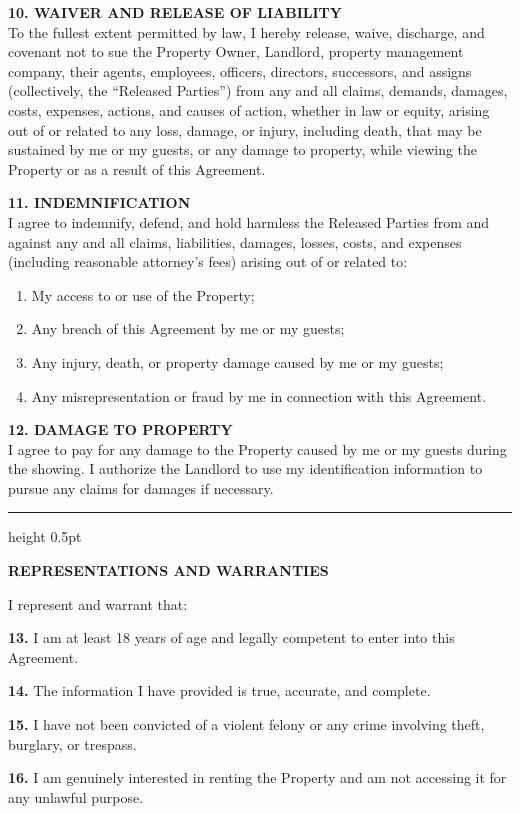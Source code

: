\documentclass[11pt, letterpaper]{article}
\newcommand{\divider}{%
    \vspace{0.3em}%
    {\color{dividercolor}\hrule height 0.5pt}%
    \vspace{0.5em}%
}
\newcommand{\sectionheader}[1]{%
    \vspace{0.8em}%
    {\large\bfseries\color{headerblue}#1}%
    \vspace{0.3em}%
}
\begin{document}
\begin{Form}
\textbf{10. WAIVER AND RELEASE OF LIABILITY}\\
To the fullest extent permitted by law, I hereby release, waive, discharge, and covenant not to sue the Property Owner, Landlord, property management company, their agents, employees, officers, directors, successors, and assigns (collectively, the ``Released Parties'') from any and all claims, demands, damages, costs, expenses, actions, and causes of action, whether in law or equity, arising out of or related to any loss, damage, or injury, including death, that may be sustained by me or my guests, or any damage to property, while viewing the Property or as a result of this Agreement.

\textbf{11. INDEMNIFICATION}\\
I agree to indemnify, defend, and hold harmless the Released Parties from and against any and all claims, liabilities, damages, losses, costs, and expenses (including reasonable attorney's fees) arising out of or related to:
\begin{enumerate}[label=\alph*), nosep, leftmargin=2em]
    \item My access to or use of the Property;
    \item Any breach of this Agreement by me or my guests;
    \item Any injury, death, or property damage caused by me or my guests;
    \item Any misrepresentation or fraud by me in connection with this Agreement.
\end{enumerate}

\textbf{12. DAMAGE TO PROPERTY}\\
I agree to pay for any damage to the Property caused by me or my guests during the showing. I authorize the Landlord to use my identification information to pursue any claims for damages if necessary.

\divider

\sectionheader{REPRESENTATIONS AND WARRANTIES}

I represent and warrant that:

\textbf{13.} I am at least 18 years of age and legally competent to enter into this Agreement.

\textbf{14.} The information I have provided is true, accurate, and complete.

\textbf{15.} I have not been convicted of a violent felony or any crime involving theft, burglary, or trespass.

\textbf{16.} I am genuinely interested in renting the Property and am not accessing it for any unlawful purpose.


\end{Form}
\end{document}
